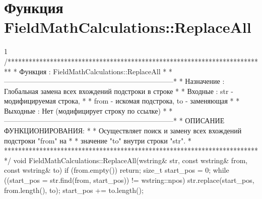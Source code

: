 \section{Функция FieldMathCalculations::ReplaceAll}
\footnotesize
\begin{listing}{1}
/*************************************************************************
* Функция       : FieldMathCalculations::ReplaceAll                      *
*------------------------------------------------------------------------*
* Назначение    : Глобальная замена всех вхождений подстроки в строке    *
* Входные       : str - модифицируемая строка,                           *
* from - искомая подстрока, to - заменяющая              *
* Выходные      : Нет (модифицирует строку по ссылке)                    *
*------------------------------------------------------------------------*
* ОПИСАНИЕ ФУНКЦИОНИРОВАНИЯ:                                             *
* Осуществляет поиск и замену всех вхождений подстроки "from" на         *
* значение "to" внутри строки "str".                                     *
*************************************************************************/
void FieldMathCalculations::ReplaceAll(wstring& str, 
                                       const wstring& from, 
                                       const wstring& to) {
    if (from.empty()) return;
    size_t start_pos = 0;
    while ((start_pos = str.find(from, start_pos)) != wstring::npos) {
        str.replace(start_pos, from.length(), to);
        start_pos += to.length();
    }
}
\end{listing}
\normalsize

\pagebreak

